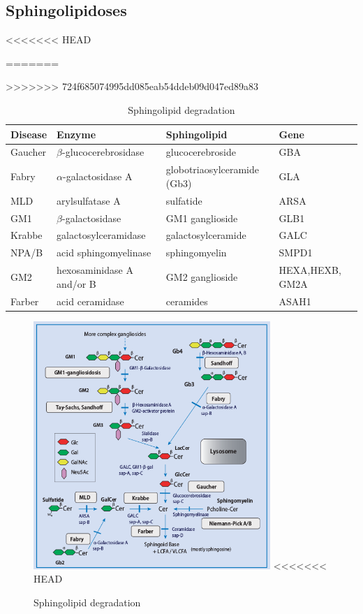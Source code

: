 \documentclass[fontsize=12pt]{scrartcl}
\begin{document}
\begin{enumerate}
\begin{enumerate}
\begin{enumerate}
\begin{enumerate}
\section{Sphingolipidoses}
<<<<<<< HEAD
\label{sec:org9d0296d}

\begin{table}[htbp]
\caption{\label{tab:orgc2722da}The Sphingolipidoses}
=======
\label{sec:org25261eb}

\begin{table}[htbp]
\caption{\label{tab:orgfb24222}
The Sphingolipidoses}
>>>>>>> 724f685074995dd085eab54ddeb09d047ed89a83
\centering
\begin{tabular}{llll}
Disease & Enzyme & Sphingolipid & Gene\\
\hline
Gaucher & \(\beta\)-glucocerebrosidase & glucocerebroside & GBA\\
Fabry & \(\alpha\)-galactosidase A & globotriaosylceramide (Gb3) & GLA\\
MLD & arylsulfatase A & sulfatide & ARSA\\
GM1 & \(\beta\)-galactosidase & GM1 ganglioside & GLB1\\
Krabbe & galactosylceramidase & galactosylceramide & GALC\\
NPA/B & acid sphingomyelinase & sphingomyelin & SMPD1\\
GM2 & hexosaminidase A and/or B & GM2 ganglioside & HEXA,HEXB, GM2A\\
Farber & acid ceramidase & ceramides & ASAH1\\
\end{tabular}
\end{table}

\begin{figure}[htbp]
\centering
\includegraphics[width=0.8\textwidth]{./figures/sl_degradation.png}
<<<<<<< HEAD
\caption{\label{fig:orgf1a3d98}Sphingolipid degradation}
\end{figure}


\end{table}
\end{enumerate}
\end{enumerate}
\end{enumerate}
\end{enumerate}
\end{document}
